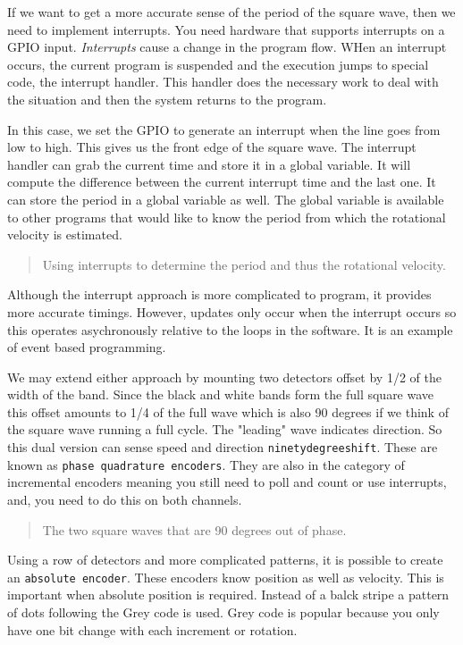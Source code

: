 If we want to get a more accurate sense of the period of the square
wave, then we need to implement interrupts. You need hardware that
supports interrupts on a GPIO input. \emph{Interrupts} cause a change in
the program flow. WHen an interrupt occurs, the current program is
suspended and the execution jumps to special code, the interrupt
handler. This handler does the necessary work to deal with the situation
and then the system returns to the program.

In this case, we set the GPIO to generate an interrupt when the line
goes from low to high. This gives us the front edge of the square wave.
The interrupt handler can grab the current time and store it in a global
variable. It will compute the difference between the current interrupt
time and the last one. It can store the period in a global variable as
well. The global variable is available to other programs that would like
to know the period from which the rotational velocity is estimated.

\begin{quote}
Using interrupts to determine the period and thus the rotational
velocity.
\end{quote}

Although the interrupt approach is more complicated to program, it
provides more accurate timings. However, updates only occur when the
interrupt occurs so this operates asychronously relative to the loops in
the software. It is an example of event based programming.

We may extend either approach by mounting two detectors offset by 1/2 of
the width of the band. Since the black and white bands form the full
square wave this offset amounts to 1/4 of the full wave which is also 90
degrees if we think of the square wave running a full cycle. The
"leading" wave indicates direction. So this dual version can sense speed
and direction \texttt{ninetydegreeshift}. These are known as
\texttt{phase\ quadrature\ encoders}. They are also in the category of
incremental encoders meaning you still need to poll and count or use
interrupts, and, you need to do this on both channels.

\begin{quote}
The two square waves that are 90 degrees out of phase.
\end{quote}

Using a row of detectors and more complicated patterns, it is possible
to create an \texttt{absolute\ encoder}. These encoders know position as
well as velocity. This is important when absolute position is required.
Instead of a balck stripe a pattern of dots following the Grey code is
used. Grey code is popular because you only have one bit change with
each increment or rotation.

